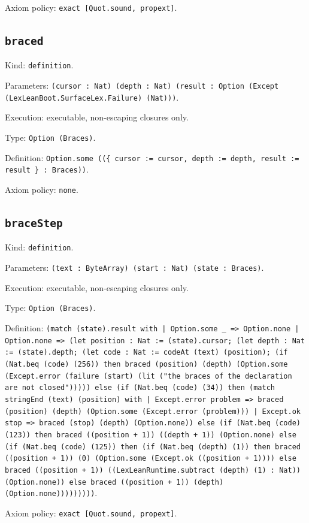 \documentclass[11pt]{article}
\begin{document}
\noindent Axiom policy: \texttt{exact [Quot.sound, propext]}.\par
\subsection*{\texttt{braced}}
\noindent Kind: \texttt{definition}.\par
\noindent Parameters: \texttt{(cursor : Nat) (depth : Nat) (result : Option (Except (LexLeanBoot.SurfaceLex.Failure) (Nat)))}.\par
\noindent Execution: executable, non-escaping closures only.\par
\noindent Type: \texttt{Option (Braces)}.\par
\noindent Definition: \texttt{Option.some ((\{ cursor := cursor, depth := depth, result := result \} : Braces))}.\par
\noindent Axiom policy: \texttt{none}.\par
\subsection*{\texttt{braceStep}}
\noindent Kind: \texttt{definition}.\par
\noindent Parameters: \texttt{(text : ByteArray) (start : Nat) (state : Braces)}.\par
\noindent Execution: executable, non-escaping closures only.\par
\noindent Type: \texttt{Option (Braces)}.\par
\noindent Definition: \texttt{(match (state).result with | Option.some \_ => Option.none | Option.none => (let position : Nat := (state).cursor; (let depth : Nat := (state).depth; (let code : Nat := codeAt (text) (position); (if (Nat.beq (code) (256)) then braced (position) (depth) (Option.some (Except.error (failure (start) (lit ("the braces of the declaration are not closed"))))) else (if (Nat.beq (code) (34)) then (match stringEnd (text) (position) with | Except.error problem => braced (position) (depth) (Option.some (Except.error (problem))) | Except.ok stop => braced (stop) (depth) (Option.none)) else (if (Nat.beq (code) (123)) then braced ((position + 1)) ((depth + 1)) (Option.none) else (if (Nat.beq (code) (125)) then (if (Nat.beq (depth) (1)) then braced ((position + 1)) (0) (Option.some (Except.ok ((position + 1)))) else braced ((position + 1)) ((LexLeanRuntime.subtract (depth) (1) : Nat)) (Option.none)) else braced ((position + 1)) (depth) (Option.none)))))))))}.\par
\noindent Axiom policy: \texttt{exact [Quot.sound, propext]}.\par
\end{document}
